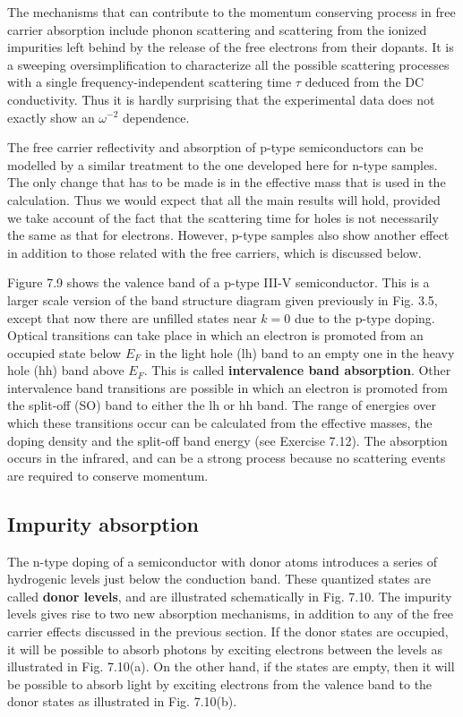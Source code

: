 \documentclass[12pt]{book}
\begin{document}
The mechanisms that can contribute to the momentum conserving process in free carrier absorption include phonon scattering and scattering from the ionized impurities left behind by the release of the free electrons from their dopants. It is a sweeping oversimplification to characterize all the possible scattering processes with a single frequency-independent scattering time $\tau$ deduced from the DC conductivity. Thus it is hardly surprising that the experimental data does not exactly show an $\omega^{-2}$ dependence.

The free carrier reflectivity and absorption of p-type semiconductors can be modelled by a similar treatment to the one developed here for n-type samples. The only change that has to be made is in the effective mass that is used in the calculation. Thus we would expect that all the main results will hold, provided we take account of the fact that the scattering time for holes is not necessarily the same as that for electrons. However, p-type samples also show another effect in addition to those related with the free carriers, which is discussed below.

Figure 7.9 shows the valence band of a p-type III-V semiconductor. This is a larger scale version of the band structure diagram given previously in Fig. 3.5, except that now there are unfilled states near $k = 0$ due to the p-type doping. Optical transitions can take place in which an electron is promoted from an occupied state below $E_F$ in the light hole (lh) band to an empty one in the heavy hole (hh) band above $E_F$. This is called \textbf{intervalence band absorption}. Other intervalence band transitions are possible in which an electron is promoted from the split-off (SO) band to either the lh or hh band. The range of energies over which these transitions occur can be calculated from the effective masses, the doping density and the split-off band energy (see Exercise 7.12). The absorption occurs in the infrared, and can be a strong process because no scattering events are required to conserve momentum.

\subsection{Impurity absorption}
The n-type doping of a semiconductor with donor atoms introduces a series of hydrogenic levels just below the conduction band. These quantized states are called \textbf{donor levels}, and are illustrated schematically in Fig. 7.10. The impurity levels gives rise to two new absorption mechanisms, in addition to any of the free carrier effects discussed in the previous section. If the donor states are occupied, it will be possible to absorb photons by exciting electrons between the levels as illustrated in Fig. 7.10(a). On the other hand, if the states are empty, then it will be possible to absorb light by exciting electrons from the valence band to the donor states as illustrated in Fig. 7.10(b).
\end{document}
